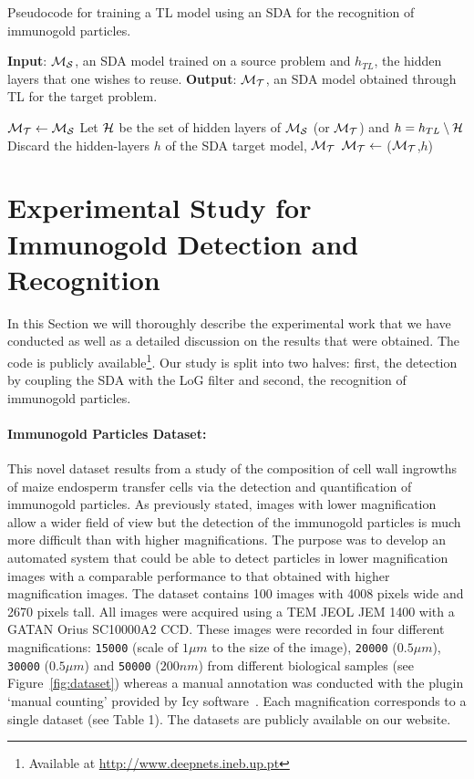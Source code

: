\documentclass[a4paper,11pt]{article}
\newcommand{\1}{\mathbbm{1}}
\newcommand{\fref}[1]{Figure~\ref{#1}}
\newcommand{\db}[1]{\texttt{#1}}
\theoremstyle{plain}
\begin{document}
\begin{algorithm*}
  \caption{Pseudocode for training a \ac{TL} model using an \ac{SDA} for the recognition of immunogold particles.}
  \label{algo:tl}
  \begin{algorithmic}[1]
    \State \textbf{Input}: ${\cal M_S}$, an \ac{SDA} model trained on a source problem and $h_{TL}$, the hidden layers that one wishes to reuse.
    \State \textbf{Output}: ${\cal M_T}$, an \ac{SDA} model obtained through TL for the target problem.


    \State ${\cal M_T} \leftarrow {\cal M_S}$ 
    \State Let ${\cal H}$ be the set of hidden layers of ${\cal M_S}$ (or ${\cal M_T}$) and $h = h_{TL} \setminus {\cal H}$\;
    \State Discard the hidden-layers $h$ of the \ac{SDA} target model, ${\cal M_T}$\;
    \State ${\cal M_T} \leftarrow$ \FineTuneNetwork(${\cal M_T}$,$h$)\;
  \end{algorithmic}
\end{algorithm*}

\section{Experimental Study for Immunogold Detection and Recognition}
\label{sec:results}
In this Section we will thoroughly describe the experimental work that we have conducted as well as a detailed discussion on the results that were obtained. The code is publicly available\footnote{Available at \url{http://www.deepnets.ineb.up.pt}}. Our study is split into two halves: first, the detection by coupling the \ac{SDA} with the \ac{LoG} filter and second, the recognition of immunogold particles.

\paragraph{Immunogold Particles Dataset:}
This novel dataset results from a study of the composition of cell wall ingrowths of maize endosperm transfer cells via the detection and quantification of immunogold particles. As previously stated, images with lower magnification allow a wider field of view but the detection of the immunogold particles is much more difficult than with higher magnifications. The purpose was to develop an automated system that could be able to detect particles in lower magnification images with a comparable performance to that obtained with higher magnification images. The dataset contains 100 images with 4008 pixels wide and 2670 pixels tall. All images were acquired using a \acf{TEM} JEOL JEM 1400 with a GATAN Orius SC10000A2 CCD. These images were recorded in four different magnifications: \db{15000} (scale of $1\mu m$ to the size of the image), \db{20000} ($0.5\mu m$), \db{30000} ($0.5\mu m$) and \db{50000} ($200 nm$) from different biological samples (see \fref{fig:dataset}) whereas a manual annotation was conducted with the plugin `manual counting' provided by Icy software~\cite{de2012icy}. Each magnification corresponds to a single dataset (see Table 1). The datasets are publicly available on our website.
\end{document}
